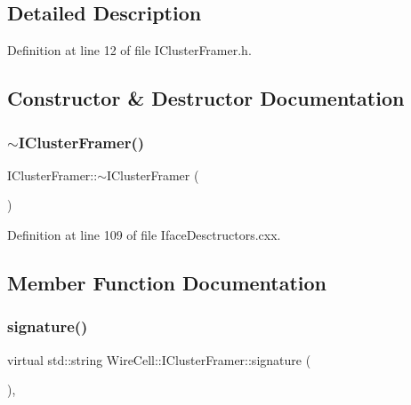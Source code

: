 \subsection{Detailed Description}


Definition at line 12 of file I\+Cluster\+Framer.\+h.



\subsection{Constructor \& Destructor Documentation}
\mbox{\label{class_wire_cell_1_1_i_cluster_framer_a4a0993899a22dbb7391fbee7868c732b}} 
\subsubsection{\texorpdfstring{$\sim$\+I\+Cluster\+Framer()}{~IClusterFramer()}}
{\footnotesize\ttfamily I\+Cluster\+Framer\+::$\sim$\+I\+Cluster\+Framer (\begin{DoxyParamCaption}{ }\end{DoxyParamCaption})\hspace{0.3cm}{\ttfamily [virtual]}}



Definition at line 109 of file Iface\+Desctructors.\+cxx.



\subsection{Member Function Documentation}
\mbox{\label{class_wire_cell_1_1_i_cluster_framer_a9609083f2abb8a7fea192970140f165d}} 
\subsubsection{\texorpdfstring{signature()}{signature()}}
{\footnotesize\ttfamily virtual std\+::string Wire\+Cell\+::\+I\+Cluster\+Framer\+::signature (\begin{DoxyParamCaption}{ }\end{DoxyParamCaption})\hspace{0.3cm}{\ttfamily [inline]}, {\ttfamily [virtual]}}



